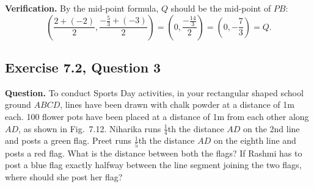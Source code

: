\textbf{Verification.} By the mid-point formula, $Q$ should be the mid-point of $PB$:
\[
\left(\frac{2+(-2)}{2},\frac{-\frac53+(-3)}{2}\right)=\left(0,\frac{-\frac{14}{3}}{2}\right)=\left(0,-\frac73\right)=Q.
\]


\subsection*{Exercise 7.2, Question 3}
\textbf{Question.} To conduct Sports Day activities, in your rectangular shaped school ground $ABCD$, lines have been drawn with chalk powder at a distance of 1m each. 100 flower pots have been placed at a distance of 1m from each other along $AD$, as shown in Fig.\ 7.12. Niharika runs $\frac14$th the distance $AD$ on the 2nd line and posts a green flag. Preet runs $\frac15$th the distance $AD$ on the eighth line and posts a red flag. What is the distance between both the flags? If Rashmi has to post a blue flag exactly halfway between the line segment joining the two flags, where should she post her flag?

